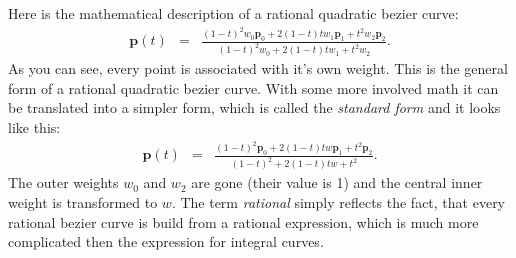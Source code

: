 \documentclass[titlepage,a4paper,11pt]{report}
\def\it{\textit}
\def\mb{\mathbf}
\def\fr{\frac}
\begin{document}
Here is the mathematical description of a rational quadratic bezier curve:
\begin{eqnarray}
  \mb{p}(t) & = & \fr{(1-t)^2w_0\mb{p}_0+2(1-t)tw_1\mb{p}_1+t^2w_2\mb{p}_2}
     {(1-t)^2w_0+2(1-t)tw_1+t^2w_2}.
\end{eqnarray}
As you can see, every point is associated with it's own weight. This is the
general form of a rational quadratic bezier curve. With some more involved
math it can be translated into a simpler form, which is called the
\it{standard form} and it looks like this:
\begin{eqnarray}
  \mb{p}(t) & = & \fr{(1-t)^2\mb{p}_0+2(1-t)tw\mb{p}_1+t^2\mb{p}_2}
     {(1-t)^2+2(1-t)tw+t^2}.
\end{eqnarray}
The outer weights $w_0$ and $w_2$ are gone (their value is 1) and the central inner weight is transformed to $w$. The term \it{rational} simply reflects the fact, that every rational bezier curve is build from a rational expression, which is much more complicated then the expression for integral curves.
\end{document}
